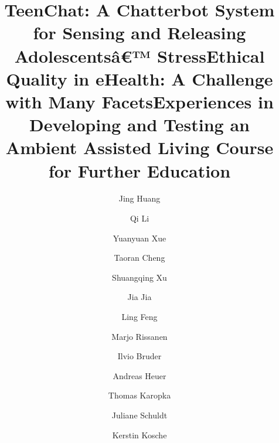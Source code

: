 \documentclass{llncs}
\begin{document}
\maketitle

\clearpage


\setcounter{page}{130}

\title{TeenChat: A Chatterbot System for Sensing and
Releasing Adolescentsâ€™ Stress}

\author{Jing Huang \and Qi Li \and Yuanyuan Xue \and Taoran Cheng \and Shuangqing Xu \and Jia Jia \and Ling Feng}



\maketitle

\clearpage


\setcounter{page}{142}

\title{Ethical Quality in eHealth: A Challenge with Many Facets}

\author{Marjo Rissanen}



\maketitle

\clearpage


\setcounter{page}{151}

\title{Experiences in Developing and Testing an Ambient Assisted Living Course for Further Education}
\author{Ilvio Bruder \and Andreas Heuer \and Thomas Karopka \and Juliane Schuldt \and Kerstin Kosche}
\end{document}
